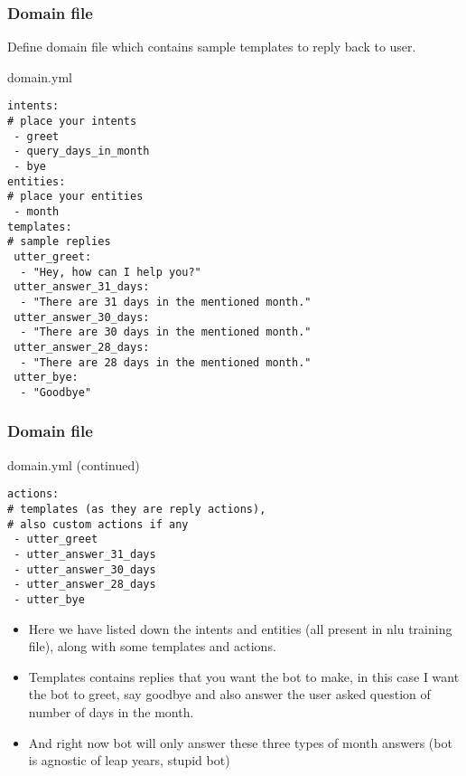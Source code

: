  \begin{frame}[fragile]\frametitle{Domain file}
Define domain file which contains sample templates to reply back to user.

domain.yml
\begin{lstlisting}
intents:
# place your intents
 - greet
 - query_days_in_month
 - bye
entities:
# place your entities
 - month
templates:
# sample replies
 utter_greet:
  - "Hey, how can I help you?"
 utter_answer_31_days:
  - "There are 31 days in the mentioned month."
 utter_answer_30_days:
  - "There are 30 days in the mentioned month."
 utter_answer_28_days:
  - "There are 28 days in the mentioned month."
 utter_bye:
  - "Goodbye"
\end{lstlisting}
\end{frame}

 \begin{frame}[fragile]\frametitle{Domain file}
domain.yml (continued)
\begin{lstlisting}
actions:
# templates (as they are reply actions),
# also custom actions if any
 - utter_greet
 - utter_answer_31_days
 - utter_answer_30_days
 - utter_answer_28_days
 - utter_bye
\end{lstlisting}

\begin{itemize}
\item Here we have listed down the intents and entities (all present in nlu training file), along with some templates and actions. 
\item Templates contains replies that you want the bot to make, in this case I want the bot to greet, say goodbye and also answer the user asked question of number of days in the month. 
\item And right now bot will only answer these three types of month answers (bot is agnostic of leap years, stupid bot)
\end{itemize}
\end{frame}


